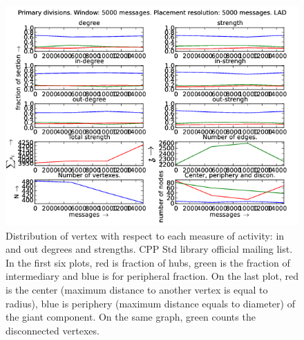 \documentclass[%
 aip,
 jmp,%
 amsmath,amssymb,
 reprint,%
]{revtex4-1}
\begin{document}
\begin{figure}[hbtp] 
   \centering
        \includegraphics[width=\textwidth]{figs/LAD/5000}
    \caption{Distribution of vertex with respect to each measure of activity: in and out degrees and strengths. CPP Std library official mailing list. In the first six plots, red is fraction of hubs, green is the fraction of intermediary and blue is for peripheral fraction. On the last plot, red is the center (maximum distance to another vertex is equal to radius), blue is periphery (maximum distance equals to diameter) of the giant component. On the same graph, green counts the disconnected vertexes.}
    \label{fig:lad5000}
\end{figure}
\end{document}
